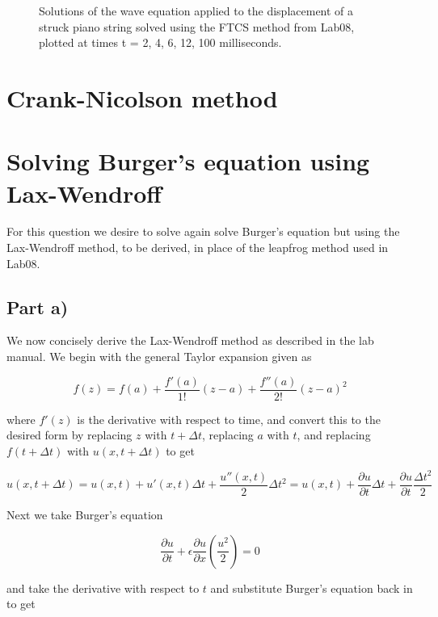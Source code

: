\documentclass{article}
\begin{document}
\begin{figure}[H]
\begin{minipage}[b]{0.33\linewidth}
  	\end{minipage}	
 	\caption{Solutions of the wave equation applied to the displacement of a struck piano string solved using the FTCS method from Lab08, plotted at times t = 2, 4, 6, 12, 100 milliseconds.} 
\label{fig:wave_FTCS} 
\end{figure}


\section{Crank-Nicolson method}

\section{Solving Burger's equation using Lax-Wendroff}
For this question we desire to solve again solve Burger's equation but using the Lax-Wendroff method, to be derived, in place of the leapfrog method used in Lab08.

\subsection{Part a)}
We now concisely derive the Lax-Wendroff method as described in the lab manual. We begin with the general Taylor expansion given as 

\begin{equation}
	f(z) = f(a) + \frac{f'(a)}{1!}(z-a) + \frac{f''(a)}{2!}(z-a)^2
\end{equation}

where $f'(z)$ is the derivative with respect to time, and convert this to the desired form by replacing $z$ with $t+\Delta t$, replacing $a$ with $t$, and replacing $f(t+\Delta t)$ with $u(x, t+\Delta t)$ to get

\begin{equation}
	\label{eq:t-exp}
	u(x,t+\Delta t) = u(x,t) + u'(x,t)\Delta t + \frac{u''(x,t)}{2}\Delta t^2
	= u(x,t) + \frac{\partial u}{\partial t}\Delta t + \frac{\partial u}{\partial t}\frac{\Delta t^2}{2}
\end{equation}

Next we take Burger's equation

\begin{equation}
	\frac{\partial u}{\partial t}+\epsilon \frac{\partial u}{\partial x} \left(\frac{u^2}{2}\right) = 0
\end{equation}

and take the derivative with respect to $t$  and substitute Burger's equation back in to get
\end{document}
